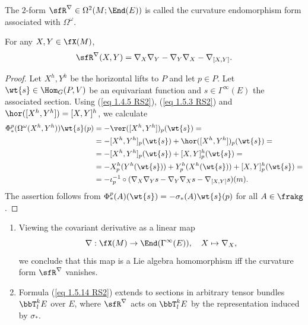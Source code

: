 \begin{defn}\label{def curvature endomorphism}
    The $2$-form $\sfR^\nabla\in\Omega^2(M;\End(E))$ is called the curvature endomorphism form associated with $\Omega^\omega$.
\end{defn}

\begin{prop}[{{\cite[Prop.~1.5.11]{RS2}}}]\label{prop 1.5.11 RS2}
    For any $X,Y\in\fX(M)$,
    \[\sfR^\nabla(X,Y)=\nabla_X\nabla_Y-\nabla_Y\nabla_X-\nabla_{[X,Y]}.\label{eq 1.5.14 RS2}\]
\end{prop}
\begin{proof}
    Let $X^h,Y^h$ be the horizontal lifts to $P$ and let $p\in P$. Let $\wt{s}\in \Hom_G(P,V)$ be an equivariant function and $s\in\Gamma^\infty(E)$ the associated section. Using (\ref{eq 1.4.5 RS2}), (\ref{eq 1.5.3 RS2}) and $\hor([X^h,Y^h])=[X,Y]^h$, we calculate
    \begin{align}
        \Phi^p_\ast(\Omega^\omega(X^h,Y^h))\wt{s}(p)&=-\ver([X^h,Y^h])_p(\wt{s})=\\
        &=-[X^h,Y^h]_p(\wt{s})+\hor([X^h,Y^h])_p(\wt{s})=\\
        &=-[X^h,Y^h]_p(\wt{s})+[X,Y]^h_p(\wt{s})=\\
        &=-X^h_p(Y^h(\wt{s}))+Y^h_p(X^h(\wt{s}))+[X,Y]_p^h(\wt{s})=\\
        &=-\iota_p^{-1}\circ (\nabla_X\nabla_Y s-\nabla_Y \nabla_X s-\nabla_{[X,Y]}s)(m).
    \end{align}
    The assertion follows from $\Phi^p_\ast(A)(\wt{s})=-\sigma_\ast(A)\wt{s}(p)$ for all $A\in\frakg$.
\end{proof}


\begin{rem}\label{rem 1.5.12 RS2}
    \begin{enumerate}
        \item Viewing the covariant derivative as a linear map
        \[\nabla:\fX(M)\to \End(\Gamma^\infty(E)),\quad X\mapsto \nabla_X,\]
        we conclude that this map is a Lie algebra homomorphism iff the curvature form $\sfR^\nabla$ vanishes.
        \item Formula (\ref{eq 1.5.14 RS2}) extends to sections in arbitrary tensor bundles $\bbT^k_l E$ over $E$, where $\sfR^\nabla$ acts on $\bbT^k_l E$ by the representation induced by $\sigma_\ast$.
    \end{enumerate}
\end{rem}


